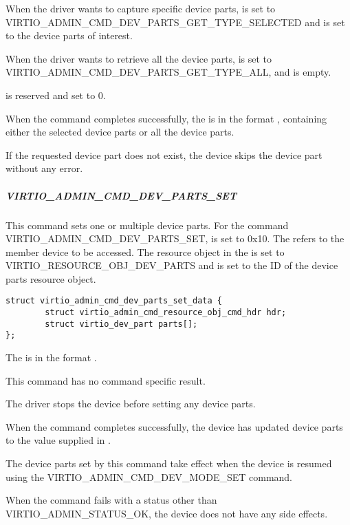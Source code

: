 When the driver wants to capture specific device parts,  is set to
VIRTIO_ADMIN_CMD_DEV_PARTS_GET_TYPE_SELECTED and  is set to the
device parts of interest.

When the driver wants to retrieve all the device parts,  is set to
VIRTIO_ADMIN_CMD_DEV_PARTS_GET_TYPE_ALL, and  is empty.

 is reserved and set to 0.

When the command completes successfully, the  is
in the format , containing
either the selected device parts or all the device parts.

If the requested device part does not exist, the device skips the device part
without any error.

\subparagraph{VIRTIO_ADMIN_CMD_DEV_PARTS_SET}\label{par:Basic Facilities of a Virtio Device / Device groups / Group administration commands / Device parts / Device parts handling commands / VIRTIO_ADMIN_CMD_DEV_PARTS_SET}

This command sets one or multiple device parts. For the command
VIRTIO_ADMIN_CMD_DEV_PARTS_SET,  is set to 0x10.
The  refers to the member device to be accessed.
The resource object  in the  is set to
VIRTIO_RESOURCE_OBJ_DEV_PARTS and  is set to the ID of the
device parts resource object.

\begin{lstlisting}
struct virtio_admin_cmd_dev_parts_set_data {
        struct virtio_admin_cmd_resource_obj_cmd_hdr hdr;
        struct virtio_dev_part parts[];
};
\end{lstlisting}

The  is in the format
.

This command has no command specific result.

The driver stops the device before setting any device parts.

When the command completes successfully, the device has updated device
parts to the value supplied in .

The device parts set by this command take effect when the device is resumed
using the VIRTIO_ADMIN_CMD_DEV_MODE_SET command.

When the command fails with a status other than VIRTIO_ADMIN_STATUS_OK, the
device does not have any side effects.

